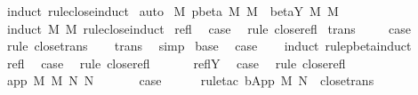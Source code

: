 \begin{isabellebody}
%
\isadelimproof
%
\endisadelimproof
%
\isatagproof
{}\isamarkupfalse%
\ {\isacharparenleft}induct\ rule{\isacharcolon}close{\isachardot}induct{\isacharparenright}\isanewline
{}\isamarkupfalse%
\ auto%
\endisatagproof
{\isafoldproof}%
%
\isadelimproof
\isanewline
%
\endisadelimproof
\isanewline
\isanewline
{}\isamarkupfalse%
\ M{}{\isacharcolon}\ {\isachardoublequoteopen}pbeta{\isacharasterisk}\ M\ M{\isacharprime}\ {\isasymLongrightarrow}\ beta{\isacharunderscore}Y{\isacharasterisk}\ M\ M{\isacharprime}{\isachardoublequoteclose}\isanewline
%
\isadelimproof
%
\endisadelimproof
%
\isatagproof
{}\isamarkupfalse%
\ {\isacharparenleft}induct\ M\ M{\isacharprime}\ rule{\isacharcolon}close{\isachardot}induct{\isacharparenright}\isanewline
{}\isamarkupfalse%
\ refl\ \isamarkupfalse%
\ {\isacharquery}case\ \isamarkupfalse%
\ {\isacharparenleft}rule\ close{\isachardot}refl{\isacharparenright}\isanewline
{}\isamarkupfalse%
\isanewline
{}\isamarkupfalse%
\ trans\ \isanewline
\ \ \isamarkupfalse%
\ {\isacharquery}case\ \isamarkupfalse%
\ {\isacharparenleft}rule\ close{\isachardot}trans{\isacharparenright}\isanewline
\ \ \isamarkupfalse%
\ trans\ \isamarkupfalse%
\ simp{\isacharplus}\isanewline
{}\isamarkupfalse%
\isanewline
{}\isamarkupfalse%
\ base\ \isamarkupfalse%
\ {\isacharquery}case\isanewline
\ \ \isamarkupfalse%
\ {\isacharparenleft}induct\ rule{\isacharcolon}pbeta{\isachardot}induct{\isacharparenright}\isanewline
\ \ \isamarkupfalse%
\ refl\ \isamarkupfalse%
\ {\isacharquery}case\ \isamarkupfalse%
\ {\isacharparenleft}rule\ close{\isachardot}refl{\isacharparenright}\isanewline
\ \ \isamarkupfalse%
\isanewline
\ \ \isamarkupfalse%
\ reflY\ \isamarkupfalse%
\ {\isacharquery}case\ \isamarkupfalse%
\ {\isacharparenleft}rule\ close{\isachardot}refl{\isacharparenright}\isanewline
\ \ \isamarkupfalse%
\ {\isacharparenleft}app\ M\ M{\isacharprime}\ N\ N{\isacharprime}{\isacharparenright}\ \isanewline
\ \ \ \ \isamarkupfalse%
\ {\isacharquery}case\isanewline
\ \ \ \ \isamarkupfalse%
\ {\isacharparenleft}rule{\isacharunderscore}tac\ b{\isacharequal}{\isachardoublequoteopen}App\ M\ N{\isacharprime}{\isachardoublequoteclose}\ \ close{\isachardot}trans{\isacharparenright}\isanewline

\end{isabellebody}
